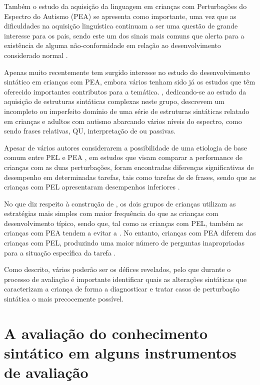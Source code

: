 \documentclass[output=paper]{LSP/langsci}
\begin{document}
Também o estudo da aquisição da linguagem em crianças com Perturbações do Espectro do Autismo (PEA) se apresenta como importante, uma vez que as dificuldades na aquisição linguística continuam a ser uma questão de grande interesse para os pais, sendo este um dos sinais mais comuns que alerta para a existência de alguma não-conformidade em relação ao desenvolvimento considerado normal \citep{lord_etal2004}. 

Apenas muito recentemente tem surgido interesse no estudo do desenvolvimento sintático em crianças com PEA, embora vários tenham sido já os estudos que têm oferecido importantes contributos para a temática. \cite{perovicjanke2013}, dedicando-se ao estudo da aquisição de estruturas sintáticas complexas neste grupo, descrevem um incompleto ou imperfeito domínio de uma série de estruturas sintáticas relatado em crianças e adultos com autismo abarcando vários níveis do espectro, como sendo frases relativas,  QU, interpretação de  ou passivas. 

Apesar de vários autores considerarem a possibilidade de uma etiologia de base comum entre PEL e PEA \citep{tagerflusbergjoseph2003,ruser_etal2007,leyfer_etal2008}, em estudos que visam comparar a performance de crianças com as duas perturbações, foram encontradas diferenças significativas de desempenho em determinadas tarefas, tais como tarefas de  de frases, sendo que as crianças com PEL apresentaram desempenhos inferiores \citep{whitehouse_etal2008}. 

No que diz respeito à construção de , os dois grupos de crianças utilizam as estratégias mais simples com maior frequência do que as crianças com desenvolvimento típico, sendo que, tal como as crianças com PEL, também as crianças com PEA tendem a evitar a . No entanto, crianças com PEA diferem das crianças com PEL, produzindo uma maior número de perguntas inapropriadas para a situação específica da tarefa \citep{tuller_etal2012}. 

Como descrito, vários poderão ser os défices revelados, pelo que durante o processo de avaliação é importante identificar quais as alterações sintáticas que caracterizam a criança de forma a diagnosticar e tratar casos de perturbação sintática o mais precocemente possível. 

\section{A avaliação do conhecimento sintático em alguns instrumentos de avaliação}
\label{sec:martins_avaliacao_conhecimento}
\end{document}
